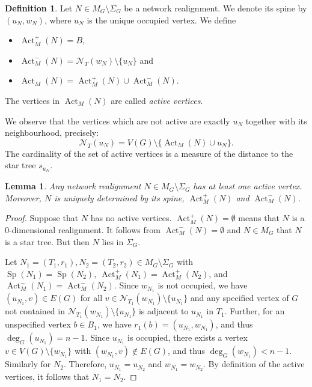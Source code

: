 \documentclass[reqno,dvipsnames]{amsart}
\theoremstyle{plain}
\newtheorem{lemma}[theorem]{Lemma}
\numberwithin{equation}{section}
\theoremstyle{definition}
\newtheorem{definition}[theorem]{Definition}
\DeclareMathOperator{\Act}{Act}
\DeclareMathOperator{\degree}{deg}
\DeclareMathOperator{\Sp}{Sp}
\begin{document}
\begin{definition}
	Let $N \in M_G\setminus \Sigma_G$ be a network realignment. We denote its spine by $(u_N,w_N)$, where $u_N$ is the unique occupied vertex. We define
	\begin{itemize}
		\item $\Act_M^+(N) = B$,
		\item $\Act_M^-(N) = \mathcal{N}_T(w_N)\setminus\{u_N\}$ \quad  and
		\item $\Act_M(N) = \Act_M^+(N) \cup \Act_M^- (N)$.
	\end{itemize}
	The vertices in $\Act_M(N)$ are called \textit{active vertices}.
\end{definition}


We observe that the vertices which are not active are exactly $u_N$ together with its neighbourhood, precisely:
\begin{equation}\label{eq:2ndMNeighb}
	\mathcal{N}_T(u_N) = V(G)\setminus \{\Act_M(N)\cup u_N\}.
\end{equation}
The cardinality of the set of active vertices is a measure of the distance to the star tree $s_{u_N}$.


\begin{lemma} \label{lem:ActDetermined}
	Any network realignment $N\in M_G\setminus \Sigma_G$ has at least one active vertex. Moreover, $N$ is uniquely determined by its spine, $\Act_M^+(N)$ and $\Act_M^-(N)$. 
\end{lemma}

\begin{proof}
	Suppose that $N$ has no active vertices. $\Act_M^+(N) = \emptyset$ means that $N$ is a 0-dimensional realignment. It follows from $\Act_M^-(N) = \emptyset$ and $N\in M_G$ that $N$ is a star tree. But then $N$ lies in $\Sigma_G$.
	
	Let $N_1 = (T_1,r_1), N_2 = (T_2,r_2) \in M_G\setminus \Sigma_G$ with $\Sp(N_1) = \Sp(N_2), \> \Act_M^+(N_1) = \Act_M^+(N_2)$, and $\Act_M^-(N_1) = \Act_M^-(N_2)$. Since $w_{N_1}$ is not occupied, we have $(u_{N_1},v)\in E(G)$ for all $v\in \mathcal{N}_{T_1}(w_{N_1})\setminus \{u_{N_1}\}$ and any specified vertex of $G$ not contained in $\mathcal{N}_{T_1}(w_{N_1})\setminus \{u_{N_1}\}$ is adjacent to $u_{N_1}$ in $T_1$. Further, for an unspecified vertex $b\in B_1$, we have $r_1(b) = (u_{N_1}, w_{N_1})$, and thus $\degree_G(u_{N_1}) = n-1$. Since $u_{N_1}$ is occupied, there exists a vertex $v\in V(G)\setminus \{w_{N_1}\}$ with $(w_{N_1},v) \notin E(G)$, and thus $\degree_G(w_{N_1}) < n-1$. Similarly for $N_2$. Therefore, $u_{N_1} = u_{N_2}$ and $w_{N_1} = w_{N_2}$. By definition of the active vertices, it follows that $N_1 = N_2$.
\end{proof}
\end{document}
